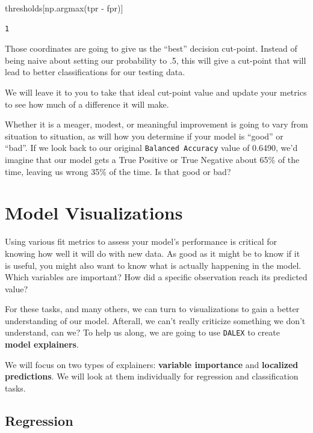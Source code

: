 \documentclass[
  letterpaper,
]{krantz}
\newenvironment{Shaded}{}{}
\newcommand{\NormalTok}[1]{#1}
\newcommand{\OperatorTok}[1]{\textcolor[rgb]{0.40,0.40,0.40}{#1}}
\begin{document}
\begin{Shaded}
\begin{Highlighting}[]
\NormalTok{thresholds[np.argmax(tpr }\OperatorTok{{-}}\NormalTok{ fpr)]}
\end{Highlighting}
\end{Shaded}

\begin{verbatim}
1
\end{verbatim}

Those coordinates are going to give us the ``best'' decision cut-point.
Instead of being naive about setting our probability to .5, this will
give a cut-point that will lead to better classifications for our
testing data.

We will leave it to you to take that ideal cut-point value and update
your metrics to see how much of a difference it will make.

Whether it is a meager, modest, or meaningful improvement is going to
vary from situation to situation, as will how you determine if your
model is ``good'' or ``bad''. If we look back to our original
\texttt{Balanced\ Accuracy} value of 0.6490, we'd imagine that our model
gets a True Positive or True Negative about 65\% of the time, leaving us
wrong 35\% of the time. Is that good or bad?

\section{Model Visualizations}\label{model-visualizations}

Using various fit metrics to assess your model's performance is critical
for knowing how well it will do with new data. As good as it might be to
know if it is useful, you might also want to know what is actually
happening in the model. Which variables are important? How did a
specific observation reach its predicted value?

For these tasks, and many others, we can turn to visualizations to gain
a better understanding of our model. Afterall, we can't really criticize
something we don't understand, can we? To help us along, we are going to
use \texttt{DALEX} to create \textbf{model explainers}.

We will focus on two types of explainers: \textbf{variable importance}
and \textbf{localized predictions}. We will look at them individually
for regression and classification tasks.

\subsection{Regression}\label{regression}
\end{document}
